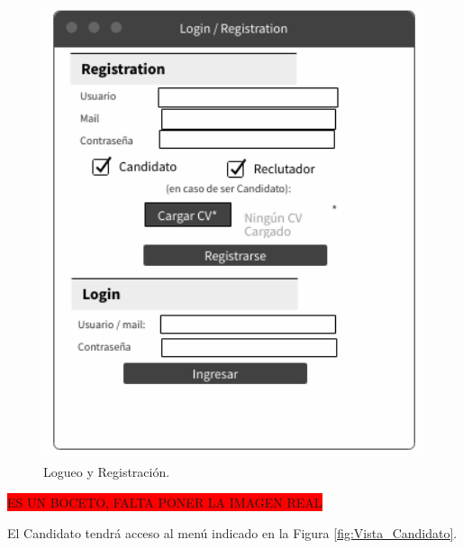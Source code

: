 \documentclass[12pt,a4paper]{article}
\begin{document}
\begin{sloppypar}
\begin{figure}[H]    %
  \centering
  \includegraphics[width=1\textwidth]{images/Vista_Registro.png}
  \caption{Logueo y Registración.}  
  \label{fig:Vista_Registro}
\end{figure}

\colorbox{red}{ES UN BOCETO, FALTA PONER LA IMAGEN REAL}

El Candidato tendrá acceso al menú indicado en la Figura \ref{fig:Vista_Candidato}. 


\end{sloppypar}
\end{document}
